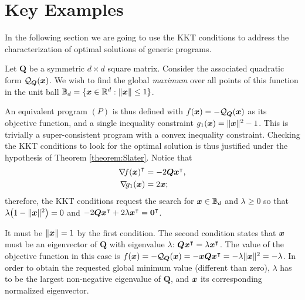 \section*{Key Examples}
In the following section we are going to use the KKT conditions to address the characterization of optimal solutions of generic programs. 

\begin{example}
Let $\boldsymbol{Q}$ be a symmetric $d \times d$ square matrix.  Consider the associated quadratic form $\mathcal{Q}_{\boldsymbol{Q}}(\boldsymbol{x})$.  We wish to find the global \emph{maximum} over all points of this function in the unit ball $\mathbb{B}_d = \{ \boldsymbol{x} \in \mathbb{R}^d : \lVert \boldsymbol{x} \rVert \leq 1 \}$.

An equivalent program $(P)$ is thus defined with $f(\boldsymbol{x}) = -\mathcal{Q}_{\boldsymbol{Q}}(\boldsymbol{x})$ as its objective function, and a single inequality constraint $g_1(\boldsymbol{x}) = \lVert \boldsymbol{x} \rVert^2-1$. This is trivially a super-consistent program with a convex inequality constraint.  Checking the KKT conditions to look for the optimal solution is thus justified under the hypothesis of Theorem \ref{theorem:Slater}.  Notice that
\begin{align*}
{\mathop{\nabla\! {f}}(\boldsymbol{x})}^\intercal &= -2 \boldsymbol{Q} {\boldsymbol{x}}^\intercal, \\
\mathop{\nabla\! {g_1}}(\boldsymbol{x}) &= 2\boldsymbol{x};
\end{align*}
therefore, the KKT conditions request the search for $\boldsymbol{x} \in \mathbb{B}_d$ and $\lambda \geq 0$ so that $\lambda \big(1-\lVert \boldsymbol{x} \rVert^2 \big)=0$ and $-2\boldsymbol{Q} {\boldsymbol{x}}^\intercal + 2\lambda{\boldsymbol{x}}^\intercal = {\boldsymbol{0}}^\intercal$.  

It must be $\lVert \boldsymbol{x} \rVert=1$ by the first condition.  The second condition states that $\boldsymbol{x}$ must be an eigenvector of $\boldsymbol{Q}$ with eigenvalue $\lambda$: $\boldsymbol{Q} {\boldsymbol{x}}^\intercal = \lambda {\boldsymbol{x}}^\intercal$.  The value of the objective function in this case is $f(\boldsymbol{x}) = -\mathcal{Q}_{\boldsymbol{Q}}(\boldsymbol{x}) = -\boldsymbol{x} \boldsymbol{Q} {\boldsymbol{x}}^\intercal = -\lambda \lVert \boldsymbol{x} \rVert^2= -\lambda$.  In order to obtain the requested global minimum value (different than zero), $\lambda$ has to be the largest non-negative eigenvalue of $\boldsymbol{Q}$, and $\boldsymbol{x}$ its corresponding normalized eigenvector.
\end{example}

